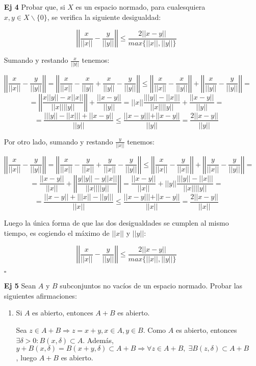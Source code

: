 \documentclass[12pt,letterpaper]{article}
\newcommand{\norm}[1]{\left|\left| #1 \right|\right|}
\newcommand{\cqd}{\hfill\ensuremath{\square}}
\begin{document}
\begin{enumerate}
\item[\textbf{Ej 4}] Probar que, si $X$ es un espacio normado, para cualesquiera $x,y\in X\smallsetminus \{0\}$, se verifica la siguiente desigualdad:

\[
\norm{\frac{x}{\norm{x}}-\frac{y}{\norm{y}}} \leq \frac{2\norm{x-y}}{max\{\norm{x},\norm{y}\}}
\]

Sumando y restando $\frac{x}{\norm{y}}$ tenemos:

\[\norm{\frac{x}{\norm{x}}-\frac{y}{\norm{y}}} = 
\norm{\frac{x}{\norm{x}}-\frac{x}{\norm{y}}+\frac{x}{\norm{y}}-\frac{y}{\norm{y}}}\leq
\norm{\frac{x}{\norm{x}}-\frac{x}{\norm{y}}}+\norm{\frac{x}{\norm{y}}-\frac{y}{\norm{y}}} =
\]
\[
=\norm{\frac{x\norm{y}-x\norm{x}}{\norm{x}\norm{y}}}+\frac{\norm{x-y}}{\norm{y}}=\norm{x}\frac{|\norm{y}-\norm{x}|}{\norm{x}\norm{y}}+\frac{\norm{x-y}}{\norm{y}}=
\]
\[
=\frac{|\norm{y}-\norm{x}|+\norm{x-y}}{\norm{y}}\leq \frac{\norm{x-y}|+\norm{x-y}}{\norm{y}} =\frac{2\norm{x-y}}{\norm{y}}
\]

Por otro lado, sumando y restando $\frac{y}{\norm{x}}$ tenemos:


\[\norm{\frac{x}{\norm{x}}-\frac{y}{\norm{y}}} = 
\norm{\frac{x}{\norm{x}}-\frac{y}{\norm{x}}+\frac{y}{\norm{x}}-\frac{y}{\norm{y}}}\leq
\norm{\frac{x}{\norm{x}}-\frac{y}{\norm{x}}}+\norm{\frac{y}{\norm{x}}-\frac{y}{\norm{y}}} =
\]
\[
=\frac{\norm{x-y}}{\norm{x}}+\norm{\frac{y\norm{y}-y\norm{x}}{\norm{x}\norm{y}}}=\frac{\norm{x-y}}{\norm{x}}+\norm{y}\frac{|\norm{y}-\norm{x}|}{\norm{x}\norm{y}}=
\]
\[
=\frac{\norm{x-y}+|\norm{x}-\norm{y}|}{\norm{x}}\leq \frac{\norm{x-y}|+\norm{x-y}}{\norm{x}} =\frac{2\norm{x-y}}{\norm{x}}
\]

Luego la única forma de que las dos desigualdades se cumplen al mismo tiempo, es cogiendo el máximo de $\norm{x}$ y $\norm{y}$:

\[
\norm{\frac{x}{\norm{x}}-\frac{y}{\norm{y}}} \leq \frac{2\norm{x-y}}{max\{\norm{x},\norm{y}\}}
\]

\cqd

\item[\textbf{Ej 5}] Sean $A$ y $B$ subconjuntos no vacíos de un espacio normado. Probar las siguientes afirmaciones:

\begin{enumerate}
\item Si $A$ es abierto, entonces $A+B$ es abierto.

Sea $z\in A+B \Rightarrow z=x+y, x\in A,y\in B$. Como $A$ es abierto, entonces $\exists \delta > 0: B(x,\delta)\subset A$. Además, $y+B(x,\delta)=B(x+y,\delta) \subset A+B \Rightarrow \forall z \in A+B, \; \exists B(z,\delta) \subset A+B$, luego $A+B$ es abierto.


\end{enumerate}
\end{enumerate}
\end{document}

